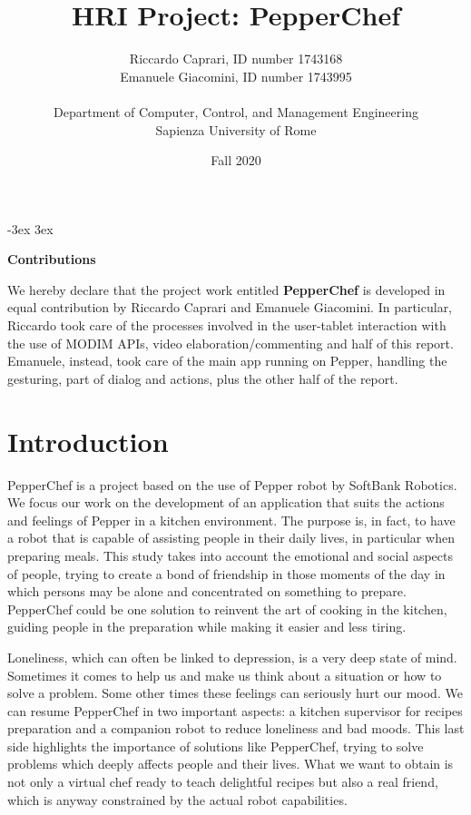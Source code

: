 \documentclass[11pt]{article}
\title{HRI Project: PepperChef}
\author{Riccardo Caprari, ID number 1743168\\Emanuele Giacomini, ID number 1743995\\ \\Department of Computer, Control, and Management Engineering \\Sapienza University of Rome}
\date{Fall 2020}
\begin{document}
\maketitle

\vspace{6px}

\openup -3ex
\tableofcontents
\openup 3ex

\newpage
\textbf{Contributions}

We hereby declare that the project work entitled \textbf{PepperChef} is developed in equal contribution by Riccardo Caprari and Emanuele Giacomini. In particular, Riccardo took care of the processes involved in the user-tablet interaction with the use of MODIM APIs, video elaboration/commenting and half of this report. Emanuele, instead, took care of the main app running on Pepper, handling the gesturing, part of dialog and actions, plus the other half of the report.


\section{Introduction}\label{cha:intro}

PepperChef is a project based on the use of Pepper robot by SoftBank Robotics. We focus our work on the development of an application that suits the actions and feelings of Pepper in a kitchen environment. The purpose is, in fact, to have a robot that is capable of assisting people in their daily lives, in particular when preparing meals. This study takes into account the emotional and social aspects of people, trying to create a bond of friendship in those moments of the day in which persons may be alone and concentrated on something to prepare. PepperChef could be one solution to reinvent the art of cooking in the kitchen, guiding people in the preparation while making it easier and less tiring.

Loneliness, which can often be linked to depression, is a very deep state of mind. Sometimes it comes to help us and make us think about a situation or how to solve a problem. Some other times these feelings can seriously hurt our mood. We can resume PepperChef in two important aspects: a kitchen supervisor for recipes preparation and a companion robot to reduce loneliness and bad moods. This last side highlights the importance of solutions like PepperChef, trying to solve problems which deeply affects people and their lives. What we want to obtain is not only a virtual chef ready to teach delightful recipes but also a real friend, which is anyway constrained by the actual robot capabilities.
\end{document}
